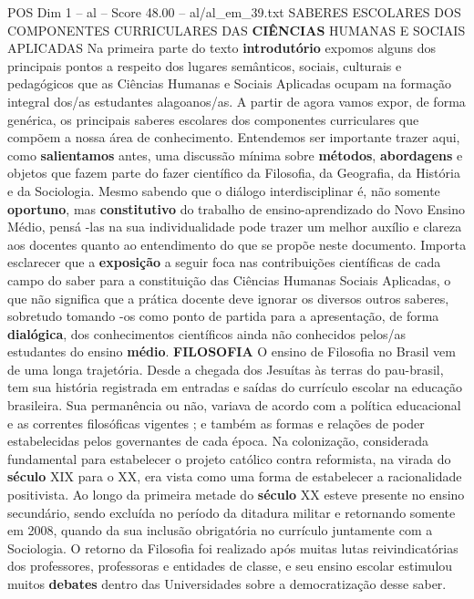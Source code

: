 \begin{textsample}{POS Dim 1 – al – Score 48.00 – al/al\_em\_39.txt}  \label{ex:f1_pos_153}
SABERES ESCOLARES DOS COMPONENTES CURRICULARES DAS \textbf{CIÊNCIAS} HUMANAS E SOCIAIS APLICADAS Na primeira parte do texto \textbf{introdutório} expomos alguns dos principais pontos a respeito dos lugares semânticos, sociais, culturais e pedagógicos que as Ciências Humanas e Sociais Aplicadas ocupam na formação integral dos/as estudantes alagoanos/as.
A partir de agora vamos expor, de forma genérica, os principais saberes escolares dos componentes curriculares que compõem a nossa área de conhecimento.
Entendemos ser importante trazer aqui, como \textbf{salientamos} antes, uma discussão mínima sobre \textbf{métodos}, \textbf{abordagens} e objetos que fazem parte do fazer científico da Filosofia, da Geografia, da História e da Sociologia.
Mesmo sabendo que o diálogo interdisciplinar é, não somente \textbf{oportuno}, mas \textbf{constitutivo} do trabalho de ensino-aprendizado do Novo Ensino Médio, pensá -las na sua individualidade pode trazer um melhor auxílio e clareza aos docentes quanto ao entendimento do que se propõe neste documento.
Importa esclarecer que a \textbf{exposição} a seguir foca nas contribuições científicas de cada campo do saber para a constituição das Ciências Humanas Sociais Aplicadas, o que não significa que a prática docente deve ignorar os diversos outros saberes, sobretudo tomando -os como ponto de partida para a apresentação, de forma \textbf{dialógica}, dos conhecimentos científicos ainda não conhecidos pelos/as estudantes do ensino \textbf{médio}. \textbf{FILOSOFIA} O ensino de Filosofia no Brasil vem de uma longa trajetória.
Desde a chegada dos Jesuítas às terras do pau-brasil, tem sua história registrada em entradas e saídas do currículo escolar na educação brasileira.
Sua permanência ou não, variava de acordo com a política educacional e as correntes filosóficas vigentes ; e também as formas e relações de poder estabelecidas pelos governantes de cada época.
Na colonização, considerada fundamental para estabelecer o projeto católico contra reformista, na virada do \textbf{século} XIX para o XX, era vista como uma forma de estabelecer a racionalidade positivista.
Ao longo da primeira metade do \textbf{século} XX esteve presente no ensino secundário, sendo excluída no período da ditadura militar e retornando somente em 2008, quando da sua inclusão obrigatória no currículo juntamente com a Sociologia.
O retorno da Filosofia foi realizado após muitas lutas reivindicatórias dos professores, professoras e entidades de classe, e seu ensino escolar estimulou muitos \textbf{debates} dentro das Universidades sobre a democratização desse saber.

\end{textsample}
